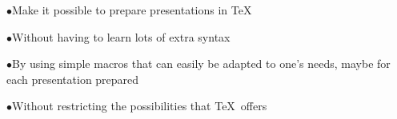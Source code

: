 

\WideAspect
\NewSlide
\normalfont
{}%
\item{$\bullet$}Make it possible to prepare presentations in \TeX
\vskip3mm
\item{$\bullet$}Without having to learn lots of extra syntax
\vskip3mm
\item{$\bullet$}By using simple macros that can easily be adapted to one's needs, maybe for each presentation prepared
\vskip3mm
\item{$\bullet$}Without restricting the possibilities that \TeX\ offers
\bye
